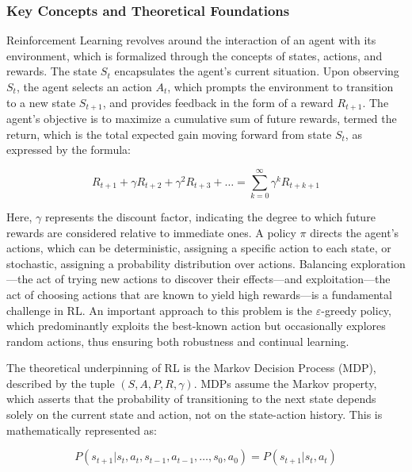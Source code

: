 \subsubsection{Key Concepts and Theoretical Foundations}

Reinforcement Learning revolves around the interaction of an agent with its environment, which is formalized through the concepts of states, actions, and rewards. The state \( S_t \) encapsulates the agent's current situation. Upon observing \( S_t \), the agent selects an action \( A_t \), which prompts the environment to transition to a new state \( S_{t+1} \), and provides feedback in the form of a reward \( R_{t+1} \). The agent's objective is to maximize a cumulative sum of future rewards, termed the return, which is the total expected gain moving forward from state \( S_t \), as expressed by the formula:

\begin{equation}
R_{t+1} + \gamma R_{t+2} + \gamma^2 R_{t+3} + \ldots = \sum_{k=0}^{\infty} \gamma^k R_{t+k+1}
\end{equation}

Here, \( \gamma \) represents the discount factor, indicating the degree to which future rewards are considered relative to immediate ones. A policy \( \pi \) directs the agent's actions, which can be deterministic, assigning a specific action to each state, or stochastic, assigning a probability distribution over actions. Balancing exploration—the act of trying new actions to discover their effects—and exploitation—the act of choosing actions that are known to yield high rewards—is a fundamental challenge in RL. An important approach to this problem is the \(\varepsilon\)-greedy policy, which predominantly exploits the best-known action but occasionally explores random actions, thus ensuring both robustness and continual learning.

The theoretical underpinning of RL is the Markov Decision Process (MDP), described by the tuple \( (S, A, P, R, \gamma) \). MDPs assume the Markov property, which asserts that the probability of transitioning to the next state depends solely on the current state and action, not on the state-action history. This is mathematically represented as:

\begin{equation}
\label{Equation:MarkovProperty}
P(s_{t+1} | s_t, a_t, s_{t-1}, a_{t-1}, \ldots, s_0, a_0) = P(s_{t+1} | s_t, a_t)
\end{equation}

